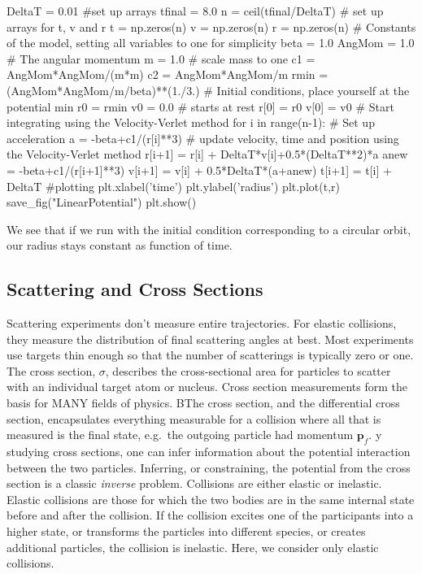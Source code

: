 \documentclass[%
oneside,                 %
final,                   %
10pt]{article}
\begin{document}
\bpycod
DeltaT = 0.01
#set up arrays 
tfinal = 8.0
n = ceil(tfinal/DeltaT)
# set up arrays for t, v and r
t = np.zeros(n)
v = np.zeros(n)
r = np.zeros(n)
# Constants of the model, setting all variables to one for simplicity
beta = 1.0
AngMom = 1.0  #  The angular momentum
m = 1.0  # scale mass to one
c1 = AngMom*AngMom/(m*m)
c2 = AngMom*AngMom/m
rmin = (AngMom*AngMom/m/beta)**(1./3.)
# Initial conditions, place yourself at the potential min
r0 = rmin
v0 = 0.0  # starts at rest
r[0] = r0
v[0] = v0
# Start integrating using the Velocity-Verlet  method
for i in range(n-1):
    # Set up acceleration
    a = -beta+c1/(r[i]**3)
    # update velocity, time and position using the Velocity-Verlet method
    r[i+1] = r[i] + DeltaT*v[i]+0.5*(DeltaT**2)*a
    anew = -beta+c1/(r[i+1]**3)
    v[i+1] = v[i] + 0.5*DeltaT*(a+anew)
    t[i+1] = t[i] + DeltaT
#plotting
plt.xlabel('time')
plt.ylabel('radius')
plt.plot(t,r)
save_fig("LinearPotential")
plt.show()


\epycod


We see that if we run with the initial condition corresponding to a circular orbit, our radius stays constant as function of time. 

\subsection{Scattering and Cross Sections}

Scattering experiments don't measure entire trajectories. For elastic
collisions, they measure the distribution of final scattering angles
at best. Most experiments use targets thin enough so that the number
of scatterings is typically zero or one. The cross section, $\sigma$,
describes the cross-sectional area for particles to scatter with an
individual target atom or nucleus. Cross section measurements form the
basis for MANY fields of physics. BThe cross section, and the
differential cross section, encapsulates everything measurable for a
collision where all that is measured is the final state, e.g.~the
outgoing particle had momentum $\bm{p}_f$. y studying cross sections,
one can infer information about the potential interaction between the
two particles. Inferring, or constraining, the potential from the
cross section is a classic {\it inverse} problem. Collisions are
either elastic or inelastic. Elastic collisions are those for which
the two bodies are in the same internal state before and after the
collision. If the collision excites one of the participants into a
higher state, or transforms the particles into different species, or
creates additional particles, the collision is inelastic. Here, we
consider only elastic collisions.
\end{document}
